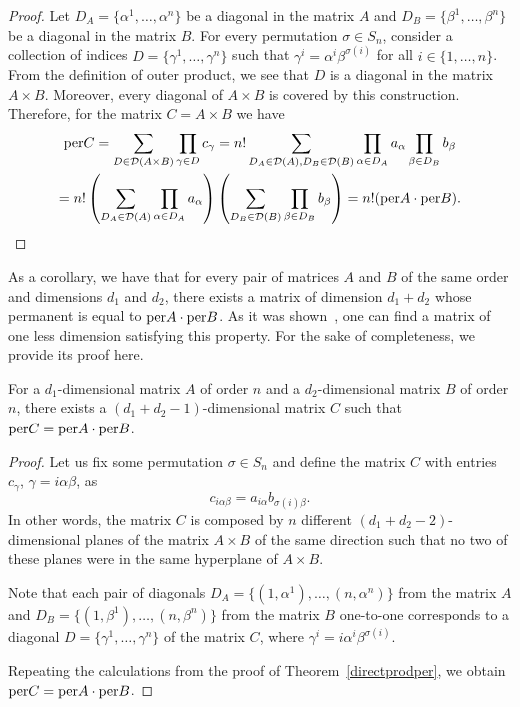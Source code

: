 \documentclass[a4paper]{article}
\begin{document}
\begin{proof}
Let $D_A = \{\alpha^1, \ldots, \alpha^n\}$ be a diagonal in the matrix $A$  and $D_B = \{ \beta^1, \ldots, \beta^n\}$  be a diagonal in the matrix $B$. For every permutation $\sigma \in S_n$, consider a collection of indices $D = \{ \gamma^1, \ldots, \gamma^n\}$ such that $\gamma^i = \alpha^i \beta^{\sigma(i)}$ for all $i \in \{ 1, \ldots, n\}$. From the definition of outer product,  we see that $D$ is a diagonal in the matrix $A \times B$. Moreover, every diagonal of $A \times B$ is  covered by this construction. 
 Therefore, for the matrix $C = A \times B$ we have
\begin{gather*}
{\rm per} C = \sum\limits_{D \in \mathcal{D}(A \times B)} \prod\limits_{\gamma \in D} c_\gamma  = n! \sum\limits_{D_A \in \mathcal{D}(A), D_B \in \mathcal{D}(B)} \prod\limits_{\alpha \in D_A}  a_{\alpha} \prod\limits_{\beta \in D_B} b_{\beta} \\
= n! \left( \sum\limits_{D_A \in \mathcal{D}(A)} \prod\limits_{\alpha \in D_A}  a_{\alpha}  \right) \left( \sum\limits_{D_B \in \mathcal{D}(B)} \prod\limits_{\beta \in D_B}  b_{\beta}  \right) =n! ({\rm per} A \cdot {\rm per} B). 
\end{gather*}
\end{proof}


As a corollary, we have that for every pair of matrices  $A$ and $B$ of the same order and dimensions $d_1$ and $d_2$,  there exists a matrix  of dimension $d_1 +d_2$ whose permanent is equal to ${\rm per} A \cdot {\rm per} B$. As it was shown~\cite{my.values01}, one can find a matrix of one less dimension satisfying this property. For the sake of completeness, we provide its proof here.


\begin{utv}
For a $d_1$-dimensional matrix $A$ of order $n$ and a $d_2$-dimensional matrix $B$ of order $n$, there exists a $(d_1 + d_2 -1)$-dimensional matrix $C$ such that ${\rm per} C = {\rm per} A \cdot {\rm per} B$. 
\end{utv}

\begin{proof}
Let us fix some permutation $\sigma \in S_n$ and define the matrix $C$ with entries $c_{\gamma}$, $\gamma = i \alpha \beta$, as
$$c_{i \alpha \beta} = a_{i \alpha} b_{\sigma(i) \beta}.$$
In other words, the matrix $C$ is  composed by $n$  different $(d_1 + d_2 -2)$-dimensional planes of the matrix $A \times B$  of the same direction such that no  two of these planes  were in the same hyperplane of $A \times B$.   

Note that each pair of diagonals $D_A = \{(1, \alpha^1), \ldots, (n, \alpha^n)\}$ from the  matrix $A$  and $D_B = \{ (1, \beta^1), \ldots, (n,\beta^n)\}$ from the matrix $B$  one-to-one corresponds to a  diagonal $D = \{ \gamma^1, \ldots, \gamma^n\}$ of the matrix $C$, where  $\gamma^i = i \alpha^i  \beta^{\sigma(i)}$. 

Repeating the calculations from the proof of Theorem~\ref{directprodper}, we obtain ${\rm per} C = {\rm per} A \cdot {\rm per} B$.
\end{proof}
\end{document}
